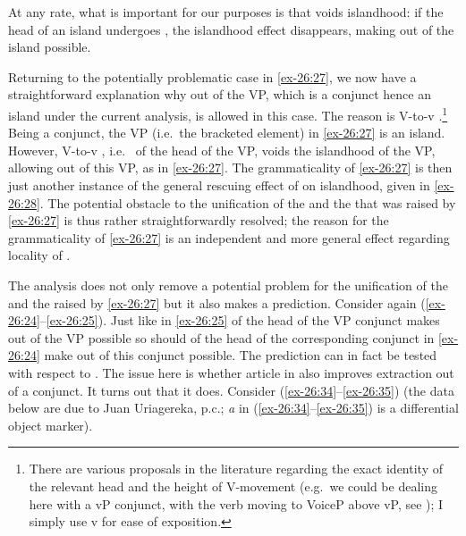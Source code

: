 \documentclass[output=paper]{langsci/langscibook}
\begin{document}
At any rate, what is important for our purposes is that  voids
islandhood: if the head of an island undergoes , the islandhood effect
disappears, making  out of the island possible.

Returning to the potentially problematic case in \eqref{ex-26:27}, we now have a
straightforward explanation why  out of the VP, which is a conjunct
hence an island under the current analysis, is allowed in this case. The reason
is V-to-v .\footnote{ There are various proposals in the literature
    regarding the exact identity of the relevant head and the height of
    V-movement (e.g.\ we could be dealing here with a vP conjunct, with the
    verb moving to VoiceP above vP, see \citealt{Collins2005}); I simply use v
    for ease of exposition.} Being a conjunct, the VP (i.e.\ the bracketed
    element) in \eqref{ex-26:27} is an island. However, V-to-v , i.e.\  of
    the head of the VP, voids the islandhood of the VP, allowing  out
    of this VP, as in \eqref{ex-26:27}. The grammaticality of \eqref{ex-26:27} is then just another
    instance of the general rescuing effect of  on islandhood,
    given in \eqref{ex-26:28}. The potential obstacle to the unification of the 
    and the  that was raised by \eqref{ex-26:27} is thus rather straightforwardly
    resolved; the reason for the grammaticality of \eqref{ex-26:27} is an independent and
    more general effect regarding locality of .

The analysis does not only remove a potential problem for the unification of
the  and the  raised by \eqref{ex-26:27} but it also makes a prediction.
Consider again (\ref{ex-26:24}--\ref{ex-26:25}). Just like in \eqref{ex-26:25}  of the head of the VP
conjunct makes  out of the VP possible so should  of the head
of the corresponding conjunct in \eqref{ex-26:24} make  out of this conjunct
possible. The prediction can in fact be tested with respect to . The
issue here is whether article  in  also improves
extraction out of a conjunct. It turns out that it does. Consider (\ref{ex-26:34}--\ref{ex-26:35})
(the  data below are due to Juan Uriagereka, p.c.; \emph{a} in
(\ref{ex-26:34}--\ref{ex-26:35}) is a differential object
marker).
\end{document}
